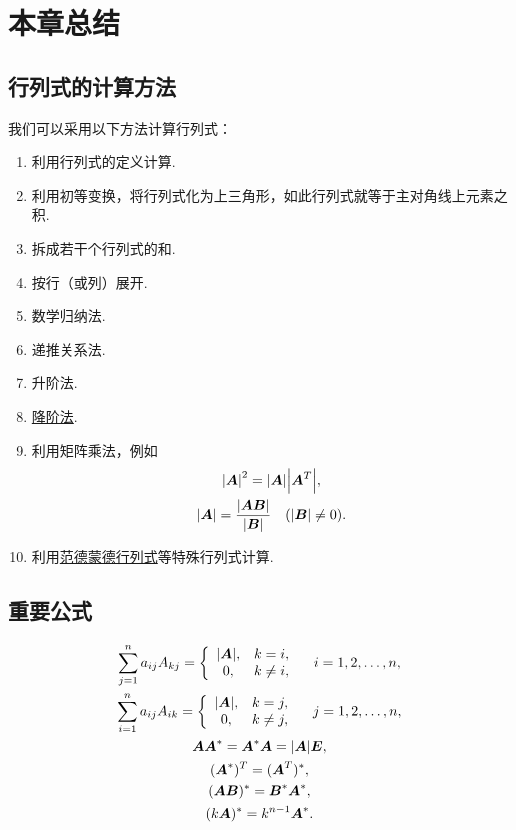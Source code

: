 \section{本章总结}
\subsection*{行列式的计算方法}
我们可以采用以下方法计算行列式：
\begin{enumerate}
	\item 利用行列式的定义计算.
	\item 利用初等变换，将行列式化为上三角形，如此行列式就等于主对角线上元素之积.
	\item 拆成若干个行列式的和.
	\item 按行（或列）展开.
	\item 数学归纳法.
	\item 递推关系法.
	\item 升阶法.
	\item \hyperref[theorem:逆矩阵.行列式降阶定理]{降阶法}.
	\item 利用矩阵乘法，例如\begin{gather*}
		\abs{\boldsymbol{A}}^2 = \abs{\boldsymbol{A}} \abs{\boldsymbol{A}^T}, \\
		\abs{\boldsymbol{A}} = \frac{\abs{\boldsymbol{A} \boldsymbol{B}}}{\abs{\boldsymbol{B}}} \quad(\abs{\boldsymbol{B}}\neq0).
	\end{gather*}
	\item 利用\hyperref[equation:行列式.范德蒙德行列式]{范德蒙德行列式}等特殊行列式计算.
\end{enumerate}

\subsection*{重要公式}
\begin{gather*}
	\sum_{j=1}^n a_{ij} A_{kj}
	= \left\{ \begin{array}{cl}
		\abs{\vb{A}}, & k = i, \\
		0, & k \neq i,
	\end{array} \right.
	\quad i=1,2,\dotsc,n, \\
	\sum_{i=1}^n a_{ij} A_{ik}
	= \left\{ \begin{array}{cl}
		\abs{\vb{A}}, & k = j, \\
		0, & k \neq j,
	\end{array} \right.
	\quad j=1,2,\dotsc,n, \\
	\vb{A} \vb{A}^* = \vb{A}^* \vb{A} = \abs{\vb{A}} \vb{E}, \\ %
	(\vb{A}^*)^T = (\vb{A}^T)^*, \\ %
	(\vb{A} \vb{B})^* = \vb{B}^* \vb{A}^*, \\ %
	(k \vb{A})^* = k^{n-1} \vb{A}^*. %
\end{gather*}

